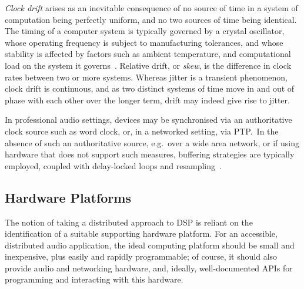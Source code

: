 \documentclass[utf8]{FrontiersinHarvard}
\begin{document}
    \textit{Clock drift} arises as an inevitable consequence of no source of
    time in a system of computation being perfectly uniform, and no two sources
    of time being identical.
    The timing of a computer system is typically governed by a crystal
    oscillator, whose operating frequency is subject to manufacturing
    tolerances, and whose stability is affected by factors such as ambient
    temperature, and computational load on the system it
    governs~\citep{marouani_internal_2008}.
    Relative drift, or \textit{skew}, is the difference in clock rates between
    two or more systems.
    Whereas jitter is a transient phenomenon, clock drift is continuous, and as
    two distinct systems of time move in and out of phase with each other over
    the longer term, drift may indeed give rise to jitter.

    In professional audio settings, devices may be synchronised via an
    authoritative clock source such as word clock, or, in a networked setting,
    via PTP.\
    In the absence of such an authoritative source, e.g.\ over a wide area
    network, or if using hardware that does not support such measures, buffering
    strategies are typically employed, coupled with delay-locked loops and
    resampling~\citep{adriaensen_using_2005, adriaensen_controlling_2012}.

    \subsection{Hardware Platforms}\label{subsec:hardware-platforms}

    The notion of taking a distributed approach to DSP is reliant on the
    identification of a suitable supporting hardware platform.
    For an accessible, distributed audio application, the ideal computing platform
    should be small and inexpensive, plus easily and rapidly programmable;
    of course, it should also provide audio and networking hardware, and, ideally,
    well-documented APIs for programming and interacting with this hardware.
\end{document}
